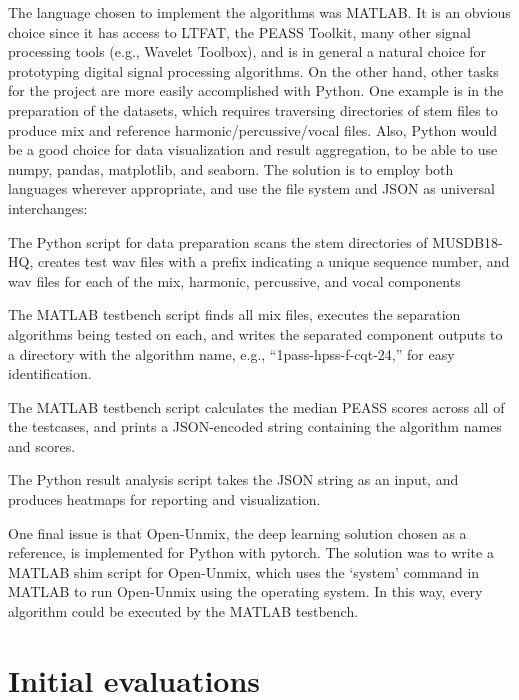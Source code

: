 \documentclass[letter,12pt]{article}
\newenvironment{tight_enumerate}{
\begin{enumerate}
  \setlength{\itemsep}{0pt}
  \setlength{\parskip}{0pt}
}{\end{enumerate}}
\begin{document}
The language chosen to implement the algorithms was MATLAB. It is an obvious choice since it has access to LTFAT, the PEASS Toolkit, many other signal processing tools (e.g., Wavelet Toolbox), and is in general a natural choice for prototyping digital signal processing algorithms. On the other hand, other tasks for the project are more easily accomplished with Python. One example is in the preparation of the datasets, which requires traversing directories of stem files to produce mix and reference harmonic/percussive/vocal files. Also, Python would be a good choice for data visualization and result aggregation, to be able to use numpy\cite{numpy}, pandas\cite{pandas}, matplotlib\cite{matplotlib}, and seaborn\cite{seaborn}. The solution is to employ both languages wherever appropriate, and use the file system and JSON as universal interchanges:
\begin{tight_enumerate}
\item
	The Python script for data preparation scans the stem directories of MUSDB18-HQ, creates test wav files with a prefix indicating a unique sequence number, and wav files for each of the mix, harmonic, percussive, and vocal components
\item
	The MATLAB testbench script finds all mix files, executes the separation algorithms being tested on each, and writes the separated component outputs to a directory with the algorithm name, e.g., ``1pass-hpss-f-cqt-24,'' for easy identification.
\item
	The MATLAB testbench script calculates the median PEASS scores across all of the testcases, and prints a JSON-encoded string containing the algorithm names and scores.
\item
	The Python result analysis script takes the JSON string as an input, and produces heatmaps for reporting and visualization.
\end{tight_enumerate}

One final issue is that Open-Unmix, the deep learning solution chosen as a reference, is implemented for Python with pytorch\cite{pytorch}. The solution was to write a MATLAB shim script for Open-Unmix, which uses the `system' command in MATLAB to run Open-Unmix using the operating system. In this way, every algorithm could be executed by the MATLAB testbench.

\section{Initial evaluations}
\label{sec:elim}
\end{document}
